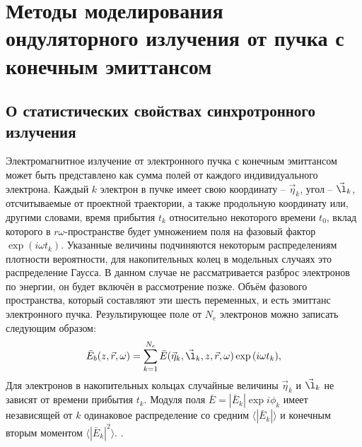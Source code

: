 
\chapter{Методы моделирования ондуляторного излучения от пучка с конечным эмиттансом} \label{chapt2}

\section{О статистических свойствах синхротронного излучения}
Электромагнитное излучение от электронного пучка с конечным эмиттансом может быть представлено как сумма полей от каждого индивидуального электрона. Каждый $k$ электрон в пучке имеет свою координату -- $\vec{\eta}_k$, угол -- $\vec{\l}_k$, отсчитываемые от проектной траектории, а также продольную координату или, другими словами, время прибытия $t_k$ относительно некоторого времени $t_0$, вклад которого в $r\omega$-пространстве будет умножением поля на фазовый фактор $\exp{(i \omega t_k)}$. Указанные величины подчиняются некоторым распределениям плотности вероятности, для накопительных колец в модельных случаях это распределение Гаусса. В данном случае не рассматривается разброс электронов по энергии, он будет включён в рассмотрение позже. Объём фазового пространства, который составляют эти шесть переменных, и есть эмиттанс электронного пучка. Результирующее поле от $N_e$ электронов можно записать следующим образом:
\begin{align}
	\bar{E}_{b} (z, \vec{r}, \omega) = \sum\limits_{k=1}^{N_e} \bar{E}(\vec{\eta}_k, \vec{\l}_k, z, \vec{r}, \omega) \exp{(i \omega t_k)},
	\label{eq:E_bunch} 
\end{align}
Для электронов в накопительных кольцах случайные величины $\vec{\eta}_k$ и $\vec{\l}_k$ не зависят от времени прибытия $t_k$. Модуля поля $\bar{E} = |\bar{E}_k|\exp{i\phi_k}$ имеет независящей от $k$ одинаковое распределение со средним $\big \langle|\bar{E}_k|\big \rangle$ и конечным вторым моментом  $\big \langle|\bar{E}_k|^2\big \rangle$. .


